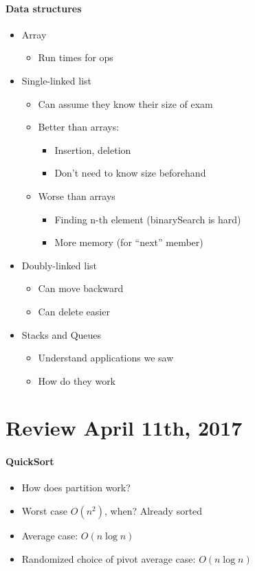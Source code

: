 \documentclass[12 pt]{article}
\theoremstyle{definition}
\begin{document}
\paragraph{Data structures}
\begin{itemize}
\item Array
  \begin{itemize}
  \item Run times for ops
  \end{itemize}
\item Single-linked list
  \begin{itemize}
    \item Can assume they know their size of exam
  \item Better than arrays:
    \begin{itemize}
    \item Insertion, deletion
      \item Don't need to know size beforehand
      \end{itemize}
    \item Worse than arrays
      \begin{itemize}
      \item Finding n-th element (binarySearch is hard)
      \item More memory (for ``next'' member)
      \end{itemize}
    \end{itemize}
  \item Doubly-linked list
    \begin{itemize}
    \item Can move backward
    \item Can delete easier
    \end{itemize}
  \item Stacks and Queues
    \begin{itemize}
    \item Understand applications we saw
    \item How do they work
    \end{itemize}
\end{itemize}
\section{Review April 11th, 2017}
\paragraph{QuickSort}
\begin{itemize}
\item How does partition work?
\item Worst case $O(n^2)$, when? Already sorted
\item Average case: $O(n \log n)$
  \item Randomized choice of pivot average case: $O(n \log n)$
  \end{itemize}
\end{document}
